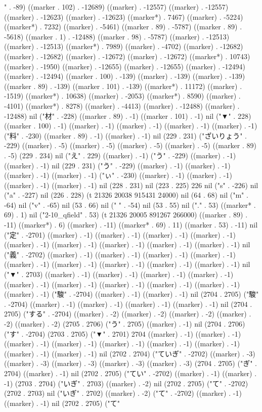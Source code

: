 " . -89) ((marker . 102) . -12689) ((marker) . -12557) ((marker) . -12557) ((marker) . -12623) ((marker) . -12623) ((marker*) . 7467) ((marker) . -5224) ((marker*) . 7232) ((marker) . -5461) ((marker . 89) . -5787) ((marker . 89) . -5618) ((marker . 1) . -12488) ((marker . 98) . -5787) ((marker) . -12513) ((marker) . -12513) ((marker*) . 7989) ((marker) . -4702) ((marker) . -12682) ((marker) . -12682) ((marker) . -12672) ((marker) . -12672) ((marker*) . 10743) ((marker) . -1950) ((marker) . -12655) ((marker) . -12655) ((marker) . -12494) ((marker) . -12494) ((marker . 100) . -139) ((marker) . -139) ((marker) . -139) ((marker . 89) . -139) ((marker . 101) . -139) ((marker*) . 11172) ((marker) . -1519) ((marker*) . 10638) ((marker) . -2053) ((marker*) . 8590) ((marker) . -4101) ((marker*) . 8278) ((marker) . -4413) ((marker) . -12488) ((marker) . -12488) nil ("材" . -228) ((marker . 89) . -1) ((marker . 101) . -1) nil ("▼" . 228) ((marker . 100) . -1) ((marker) . -1) ((marker) . -1) ((marker) . -1) ((marker) . -1) ("料" . -230) ((marker . 89) . -1) ((marker) . -1) nil (229 . 231) ("ざいりょう" . -229) ((marker) . -5) ((marker) . -5) ((marker) . -5) ((marker) . -5) ((marker . 89) . -5) (229 . 234) nil ("え" . 229) ((marker) . -1) ("う" . -229) ((marker) . -1) ((marker) . -1) nil (229 . 231) ("う" . -229) ((marker) . -1) ((marker) . -1) ((marker) . -1) ((marker) . -1) ("ぃ" . -230) ((marker) . -1) ((marker) . -1) ((marker) . -1) ((marker) . -1) nil (228 . 231) nil (223 . 225) 226 nil ("s" . -226) nil ("a" . -227) nil (226 . 228) (t 21326 20038 915431 24000) nil (64 . 68) nil ("m" . -64) nil ("v" . -65) nil (53 . 66) nil (" " . -54) nil (53 . 55) nil ("." . 53) ((marker* . 69) . 1) nil ("2-10_qfield" . 53) (t 21326 20005 891267 266000) ((marker . 89) . -11) ((marker*) . 6) ((marker) . -11) ((marker* . 69) . 11) ((marker . 53) . -11) nil ("定" . -2701) ((marker) . -1) ((marker) . -1) ((marker) . -1) ((marker) . -1) ((marker) . -1) ((marker) . -1) ((marker) . -1) ((marker) . -1) ((marker) . -1) nil ("義" . -2702) ((marker) . -1) ((marker) . -1) ((marker) . -1) ((marker) . -1) ((marker) . -1) ((marker) . -1) ((marker) . -1) ((marker) . -1) ((marker) . -1) nil ("▼" . 2703) ((marker) . -1) ((marker) . -1) ((marker) . -1) ((marker) . -1) ((marker) . -1) ((marker) . -1) ((marker) . -1) ((marker) . -1) ((marker) . -1) ((marker) . -1) ("駿" . -2704) ((marker) . -1) ((marker) . -1) nil (2704 . 2705) ("駿" . -2704) ((marker) . -1) ((marker) . -1) ((marker) . -1) ((marker) . -1) nil (2704 . 2705) ("する" . -2704) ((marker) . -2) ((marker) . -2) ((marker) . -2) ((marker) . -2) ((marker) . -2) (2705 . 2706) ("う" . 2705) ((marker) . -1) nil (2704 . 2706) ("す" . -2704) (2703 . 2705) ("▼" . 2701) 2704 ((marker) . -1) ((marker) . -1) ((marker) . -1) ((marker) . -1) ((marker) . -1) ((marker) . -1) ((marker) . -1) ((marker) . -1) ((marker) . -1) nil (2702 . 2704) ("ていぎ" . -2702) ((marker) . -3) ((marker) . -3) ((marker) . -3) ((marker) . -3) ((marker) . -3) (2704 . 2705) ("ぎ" . 2704) ((marker) . -1) nil (2702 . 2705) ("てい" . -2702) ((marker) . -1) ((marker) . -1) (2703 . 2704) ("いぎ" . 2703) ((marker) . -2) nil (2702 . 2705) ("て" . -2702) (2702 . 2703) nil ("いぎ" . 2702) ((marker) . -2) ("て" . -2702) ((marker) . -1) ((marker) . -1) nil (2702 . 2705) ("て" 